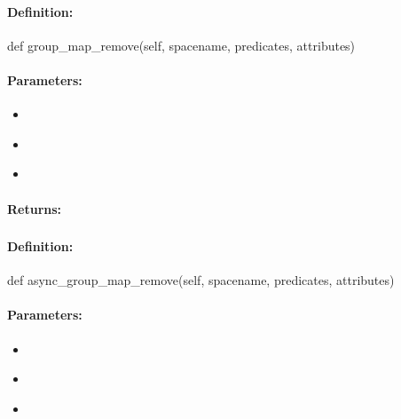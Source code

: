 \paragraph{Definition:}
\begin{pythoncode}
def group_map_remove(self, spacename, predicates, attributes)
\end{pythoncode}

\paragraph{Parameters:}
\begin{itemize}[noitemsep]
\item {}\\

\item {}\\

\item {}\\

\end{itemize}

\paragraph{Returns:}


\pagebreak
\subsubsection{}
\label{api:python:async_group_map_remove}


\paragraph{Definition:}
\begin{pythoncode}
def async_group_map_remove(self, spacename, predicates, attributes)
\end{pythoncode}

\paragraph{Parameters:}
\begin{itemize}[noitemsep]
\item {}\\

\item {}\\

\item {}\\

\end{itemize}

